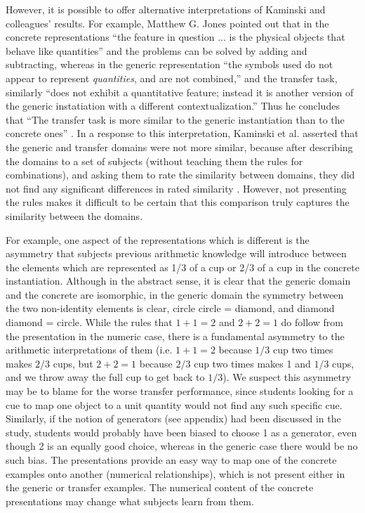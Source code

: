 \documentclass[man,10pt]{apa6}
\begin{document}
However, it is possible to offer alternative interpretations of Kaminski and colleagues' results. For example, Matthew G. Jones pointed out that in the concrete representations ``the feature in question ... is the physical objects that behave like quantities'' and the problems can be solved by adding and subtracting, whereas in the generic representation ``the symbols used do not appear to represent \emph{quantities}, and are not combined,'' and the transfer task, similarly ``does not exhibit a quantitative feature; instead it is another version of the generic instatiation with a different contextualization.'' Thus he concludes that ``The transfer task is more similar to the generic instantiation than to the concrete ones'' \cite{Jones2009}. In a response to this interpretation, Kaminski et al. asserted that the generic and transfer domains were not more similar, because after describing the domains to a set of subjects (without teaching them the rules for combinations), and asking them to rate the similarity between domains, they did not find any significant differences in rated similarity \cite{Kaminski2009}. However, not presenting the rules makes it difficult to be certain that this comparison truly captures the similarity between the domains. \par
For example, one aspect of the representations which is different is the asymmetry that subjects previous arithmetic knowledge will introduce between the elements which are represented as 1/3 of a cup or 2/3 of a cup in the concrete instantiation. Although in the abstract sense, it is clear that the generic domain and the concrete are isomorphic, in the generic domain the symmetry between the two non-identity elements is clear, circle circle = diamond, and diamond diamond = circle. While the rules that $1+1=2$ and $2+2=1$ do follow from the presentation in the numeric case, there is a fundamental asymmetry to the arithmetic interpretations of them (i.e. $1+1 = 2$ because $1/3$ cup two times makes $2/3$ cups, but $2+2 = 1$ because $2/3$ cup two times makes 1 and $1/3$ cups, and we throw away the full cup to get back to $1/3$). We suspect this asymmetry may be to blame for the worse transfer performance, since students looking for a cue to map one object to a unit quantity would not find any such specific cue. Similarly, if the notion of generators (see appendix) had been discussed in the study, students would probably have been biased to choose 1 as a generator, even though 2 is an equally good choice, whereas in the generic case there would be no such bias. The presentations provide an easy way to map one of the concrete examples onto another (numerical relationships), which is not present either in the generic or transfer examples. The numerical content of the concrete presentations may change what subjects learn from them. \par
\end{document}
